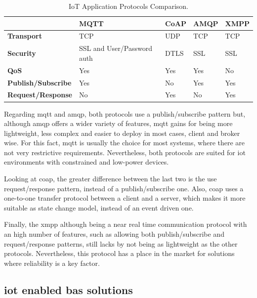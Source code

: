 \begin{table}[]
	\centering
	\begin{tabular}{|l|l|l|l|l|}
		\hline
		& \textbf{MQTT}              & \textbf{CoAP} & \textbf{AMQP} & \textbf{XMPP} \\ \hline
		\textbf{Transport}         & TCP                        & UDP           & TCP           & TCP           \\ \hline
		\textbf{Security}          & SSL and User/Password auth & DTLS          & SSL           & SSL           \\ \hline
		\textbf{QoS}               & Yes                        & Yes           & Yes           & No            \\ \hline
		\textbf{Publish/Subscribe} & Yes                        & No            & Yes           & Yes           \\ \hline
		\textbf{Request/Response}  & No                         & Yes           & No            & Yes           \\ \hline
	\end{tabular}
	\caption{IoT Application Protocols Comparison.}
	\label{iotapplayer}
\end{table}

Regarding \ac{mqtt} and \ac{amqp}, both protocols use a publish/subscribe pattern but, although \ac{amqp} offers a wider variety of features, \ac{mqtt} gains for being more lightweight, less complex and easier to deploy in most cases, client and broker wise. For this fact, \ac{mqtt} is usually the choice for most systems, where there are not very restrictive requirements. Nevertheless, both protocols are suited for \ac{iot} environments with constrained and low-power devices.

Looking at \ac{coap}, the greater difference between the last two is the use request/response pattern, instead of a publish/subscribe one. Also, \ac{coap} uses a one-to-one transfer protocol between a client and a server, which makes it more suitable as state change model, instead of an event driven one.

Finally, the \ac{xmpp} although being a near real time communication protocol with an high number of features, such as allowing both publish/subscribe and request/response patterns, still lacks by not being as lightweight as the other protocols. Nevertheless, this protocol has a place in the market for solutions where reliability is a key factor.


\subsection{\ac{iot} enabled \ac{bas} solutions}

